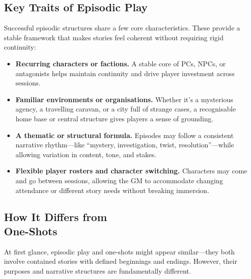 \subsection*{Key Traits of Episodic Play}

Successful episodic structures share a few core characteristics. These provide a stable framework that makes stories feel coherent without requiring rigid continuity:

\begin{itemize}
    \item \textbf{Recurring characters or factions.} A stable core of PCs, NPCs, or antagonists helps maintain continuity and drive player investment across sessions.
    
    \item \textbf{Familiar environments or organisations.} Whether it's a mysterious agency, a travelling caravan, or a city full of strange cases, a recognisable home base or central structure gives players a sense of grounding.

    \item \textbf{A thematic or structural formula.} Episodes may follow a consistent narrative rhythm—like “mystery, investigation, twist, resolution”—while allowing variation in content, tone, and stakes.

    \item \textbf{Flexible player rosters and character switching.} Characters may come and go between sessions, allowing the GM to accommodate changing attendance or different story needs without breaking immersion.
\end{itemize}

\subsection*{How It Differs from\\ One-Shots}

At first glance, episodic play and one-shots might appear similar—they both involve contained stories with defined beginnings and endings. However, their purposes and narrative structures are fundamentally different.

